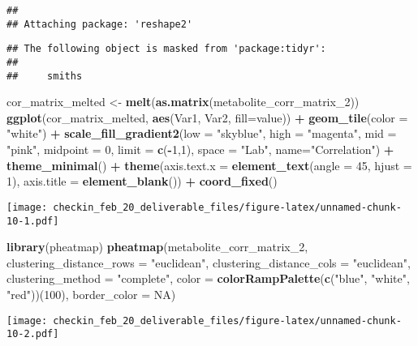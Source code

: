 \documentclass[
]{article}
\newenvironment{Shaded}{\begin{snugshade}}{\end{snugshade}}
\newcommand{\AttributeTok}[1]{\textcolor[rgb]{0.13,0.29,0.53}{#1}}
\newcommand{\ConstantTok}[1]{\textcolor[rgb]{0.56,0.35,0.01}{#1}}
\newcommand{\DecValTok}[1]{\textcolor[rgb]{0.00,0.00,0.81}{#1}}
\newcommand{\FunctionTok}[1]{\textcolor[rgb]{0.13,0.29,0.53}{\textbf{#1}}}
\newcommand{\NormalTok}[1]{#1}
\newcommand{\OtherTok}[1]{\textcolor[rgb]{0.56,0.35,0.01}{#1}}
\newcommand{\SpecialCharTok}[1]{\textcolor[rgb]{0.81,0.36,0.00}{\textbf{#1}}}
\newcommand{\StringTok}[1]{\textcolor[rgb]{0.31,0.60,0.02}{#1}}
\begin{document}
\begin{verbatim}
## 
## Attaching package: 'reshape2'
\end{verbatim}

\begin{verbatim}
## The following object is masked from 'package:tidyr':
## 
##     smiths
\end{verbatim}

\begin{Shaded}
\begin{Highlighting}[]
\NormalTok{cor\_matrix\_melted }\OtherTok{\textless{}{-}} \FunctionTok{melt}\NormalTok{(}\FunctionTok{as.matrix}\NormalTok{(metabolite\_corr\_matrix\_2))}
\FunctionTok{ggplot}\NormalTok{(cor\_matrix\_melted, }\FunctionTok{aes}\NormalTok{(Var1, Var2, }\AttributeTok{fill=}\NormalTok{value)) }\SpecialCharTok{+}
  \FunctionTok{geom\_tile}\NormalTok{(}\AttributeTok{color =} \StringTok{"white"}\NormalTok{) }\SpecialCharTok{+}
  \FunctionTok{scale\_fill\_gradient2}\NormalTok{(}\AttributeTok{low =} \StringTok{"skyblue"}\NormalTok{, }\AttributeTok{high =} \StringTok{"magenta"}\NormalTok{, }\AttributeTok{mid =} \StringTok{"pink"}\NormalTok{, }
                       \AttributeTok{midpoint =} \DecValTok{0}\NormalTok{, }\AttributeTok{limit =} \FunctionTok{c}\NormalTok{(}\SpecialCharTok{{-}}\DecValTok{1}\NormalTok{,}\DecValTok{1}\NormalTok{), }\AttributeTok{space =} \StringTok{"Lab"}\NormalTok{, }
                       \AttributeTok{name=}\StringTok{"Correlation"}\NormalTok{) }\SpecialCharTok{+}
  \FunctionTok{theme\_minimal}\NormalTok{() }\SpecialCharTok{+} 
  \FunctionTok{theme}\NormalTok{(}\AttributeTok{axis.text.x =} \FunctionTok{element\_text}\NormalTok{(}\AttributeTok{angle =} \DecValTok{45}\NormalTok{, }\AttributeTok{hjust =} \DecValTok{1}\NormalTok{),}
        \AttributeTok{axis.title =} \FunctionTok{element\_blank}\NormalTok{()) }\SpecialCharTok{+}
  \FunctionTok{coord\_fixed}\NormalTok{()}
\end{Highlighting}
\end{Shaded}

\texttt{[image: checkin\_feb\_20\_deliverable\_files/figure-latex/unnamed-chunk-10-1.pdf]}

\begin{Shaded}
\begin{Highlighting}[]
\FunctionTok{library}\NormalTok{(pheatmap)}
\FunctionTok{pheatmap}\NormalTok{(metabolite\_corr\_matrix\_2, }
         \AttributeTok{clustering\_distance\_rows =} \StringTok{"euclidean"}\NormalTok{,}
         \AttributeTok{clustering\_distance\_cols =} \StringTok{"euclidean"}\NormalTok{,}
         \AttributeTok{clustering\_method =} \StringTok{"complete"}\NormalTok{,}
         \AttributeTok{color =} \FunctionTok{colorRampPalette}\NormalTok{(}\FunctionTok{c}\NormalTok{(}\StringTok{"blue"}\NormalTok{, }\StringTok{"white"}\NormalTok{, }\StringTok{"red"}\NormalTok{))(}\DecValTok{100}\NormalTok{),}
         \AttributeTok{border\_color =} \ConstantTok{NA}\NormalTok{)}
\end{Highlighting}
\end{Shaded}

\texttt{[image: checkin\_feb\_20\_deliverable\_files/figure-latex/unnamed-chunk-10-2.pdf]}
\end{document}
